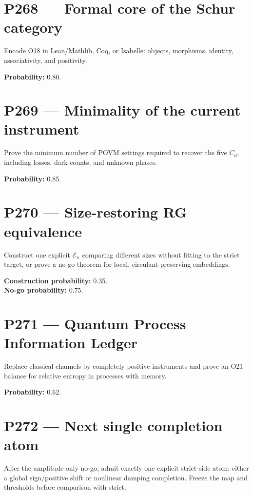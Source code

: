 \documentclass[11pt,a4paper,openany]{report}
\begin{document}
\section{P268 --- Formal core of the Schur category}

Encode O18 in Lean/\allowbreak{}Mathlib, Coq, or Isabelle: objects, morphisms, identity, associativity, and positivity.

\textbf{Probability:} 0.80.

\section{P269 --- Minimality of the current instrument}

Prove the minimum number of POVM settings required to recover the five \(C_d\), including losses, dark counts, and unknown phases.

\textbf{Probability:} 0.85.

\section{P270 --- Size-restoring RG equivalence}

Construct one explicit \(\mathcal E_n\) comparing different sizes without fitting to the strict target, or prove a no-go theorem for local, circulant-preserving embeddings.

\textbf{Construction probability:} 0.35.\\
\textbf{No-go probability:} 0.75.

\section{P271 --- Quantum Process Information Ledger}

Replace classical channels by completely positive instruments and prove an O21 balance for relative entropy in processes with memory.

\textbf{Probability:} 0.62.

\section{P272 --- Next single completion atom}

After the amplitude-only no-go, admit exactly one explicit strict-side atom: either a global sign/\allowbreak{}positive shift or nonlinear damping completion. Freeze the map and thresholds before comparison with strict.
\end{document}

